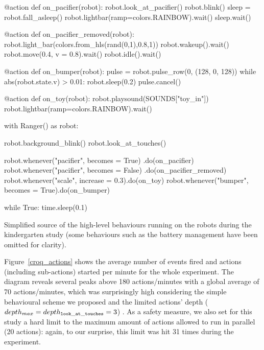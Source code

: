 \documentclass[letterpaper, 10pt, conference]{ieeeconf}      %
\begin{document}
\begin{listing}[h!]

\begin{pythoncode}
    @action
    def on_pacifier(robot):
        robot.look_at_pacifier()
        robot.blink()
        sleep = robot.fall_asleep()
        robot.lightbar(ramp=colors.RAINBOW).wait()
        sleep.wait()
    
    @action
    def on_pacifier_removed(robot):
        robot.light_bar(colors.from_hls(rand(0,1),0.8,1))
        robot.wakeup().wait()
        robot.move(0.4, v = 0.8).wait()
        robot.idle().wait()
    
    @action
    def on_bumper(robot):
        pulse = robot.pulse_row(0, (128, 0, 128))
        while abs(robot.state.v) > 0.01:
            robot.sleep(0.2)
        pulse.cancel()
    
    @action
    def on_toy(robot):
        robot.playsound(SOUNDS["toy_in"])
        robot.lightbar(ramp=colors.RAINBOW).wait()
    
    with Ranger() as robot:
    
        robot.background_blink()
        robot.look_at_touches()
    
        robot.whenever("pacifier", becomes = True)
                                    .do(on_pacifier)
        robot.whenever("pacifier", becomes = False)
                                    .do(on_pacifier_removed)
        robot.whenever("scale", increase = 0.3).do(on_toy)
        robot.whenever("bumper", becomes = True).do(on_bumper)
    
        while True:
            time.sleep(0.1)
\end{pythoncode}
\caption{Simplified source of the high-level behaviours running on the robots during the
kindergarten study (some behaviours such as the battery management have been omitted for
clarity).}
\label{croquignole_no_move}
\end{listing}

Figure~\ref{croq_actions} shows the average number of events fired and actions
(including sub-actions) started per minute for the whole experiment. The
diagram reveals several peaks above 180 actions/minutes with a global average of
70 actions/minutes, which was surprisingly high considering the simple
behavioural scheme we proposed and the limited actions' depth
($depth_{max}=depth_{\tt look\_at\_touches}=3$) . As a safety measure, we also
set for this study a hard limit to the maximum amount of actions allowed to run
in parallel (20 actions): again, to our surprise, this limit was hit 31 times
during the experiment.
\end{document}
